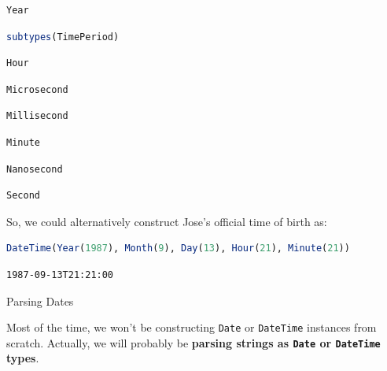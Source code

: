 \documentclass[
  notoc %
]{tufte-book}
\makeatletter
\newcommand{\passthrough}[1]{#1}
\renewcommand\subsubsection{%
\@startsection{subsubsection}{3}{\z@ }{-3.25ex\@plus -1ex \@minus -.2ex}{1.5ex \@plus .2ex}{\normalfont \normalsize \bfseries }
}
\makeatother
\begin{document}
\begin{lstlisting}[language=Output]
Year
\end{lstlisting}

\begin{lstlisting}[language=Julia]
subtypes(TimePeriod)
\end{lstlisting}

\begin{lstlisting}[language=Output]
Hour
\end{lstlisting}

\begin{lstlisting}[language=Output]
Microsecond
\end{lstlisting}

\begin{lstlisting}[language=Output]
Millisecond
\end{lstlisting}

\begin{lstlisting}[language=Output]
Minute
\end{lstlisting}

\begin{lstlisting}[language=Output]
Nanosecond
\end{lstlisting}

\begin{lstlisting}[language=Output]
Second
\end{lstlisting}

So, we could alternatively construct Jose's official time of birth as:

\begin{lstlisting}[language=Julia]
DateTime(Year(1987), Month(9), Day(13), Hour(21), Minute(21))
\end{lstlisting}

\begin{lstlisting}[language=Output]
1987-09-13T21:21:00
\end{lstlisting}

\hypertarget{sec:dates_parsing}{%
\subsubsection{Parsing Dates}\label{sec:dates_parsing}}

Most of the time, we won't be constructing
\passthrough{\lstinline!Date!} or \passthrough{\lstinline!DateTime!}
instances from scratch. Actually, we will probably be \textbf{parsing
strings as \passthrough{\lstinline!Date!} or
\passthrough{\lstinline!DateTime!} types}.
\end{document}
